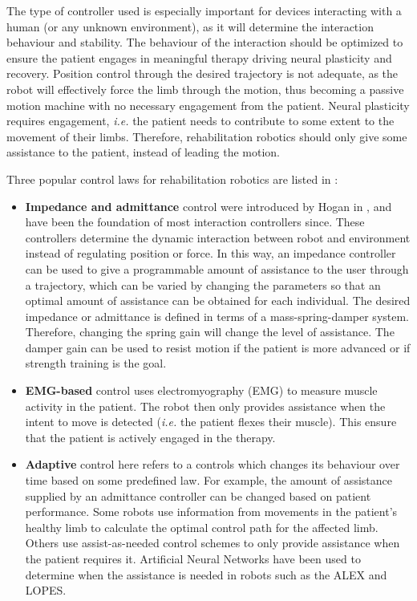\documentclass[12pt]{report}
\begin{document}
	The type of controller used is especially important for devices interacting with a human (or any unknown environment), as it will determine the interaction behaviour and stability. The behaviour of the interaction should be optimized to ensure the patient engages in meaningful therapy driving neural plasticity and recovery. Position control through the desired trajectory is not adequate, as the robot will effectively force the limb through the motion, thus becoming a passive motion machine with no necessary engagement from the patient. Neural plasticity requires engagement, \textit{i.e.} the patient needs to contribute to some extent to the movement of their limbs. Therefore, rehabilitation robotics should only give some assistance to the patient, instead of leading the motion. 
	
	Three popular control laws for rehabilitation robotics are listed in \cite{Meng2015}:
	
\begin{itemize}

	\item \textbf{Impedance and admittance} control were introduced by Hogan in \cite{Hogan1985}, and have been the foundation of most interaction controllers since. These controllers determine the dynamic interaction between robot and environment instead of regulating position or force. In this way, an impedance controller can be used to give a programmable amount of assistance to the user through a trajectory, which can be varied by changing the parameters so that an optimal amount of assistance can be obtained for each individual. The desired impedance or admittance is defined in terms of a mass-spring-damper system. Therefore, changing the spring gain will change the level of assistance. The damper gain can be used to resist motion if the patient is more advanced or if strength training is the goal.
	
	\item \textbf{EMG-based} control uses electromyography (EMG) to measure muscle activity in the patient. The robot then only provides assistance when the intent to move is detected (\textit{i.e.} the patient flexes their muscle). This ensure that the patient is actively engaged in the therapy. 
	
	\item \textbf{Adaptive} control here refers to a controls which changes its behaviour over time based on some predefined law. For example, the amount of assistance supplied by an admittance controller can be changed based on patient performance. Some robots use information from movements in the patient's healthy limb to calculate the optimal control path for the affected limb. Others use assist-as-needed control schemes to only provide assistance when the patient requires it. Artificial Neural Networks have been used to determine when the assistance is needed in robots such as the ALEX and LOPES.
	
\end{itemize}
		
\end{document}
